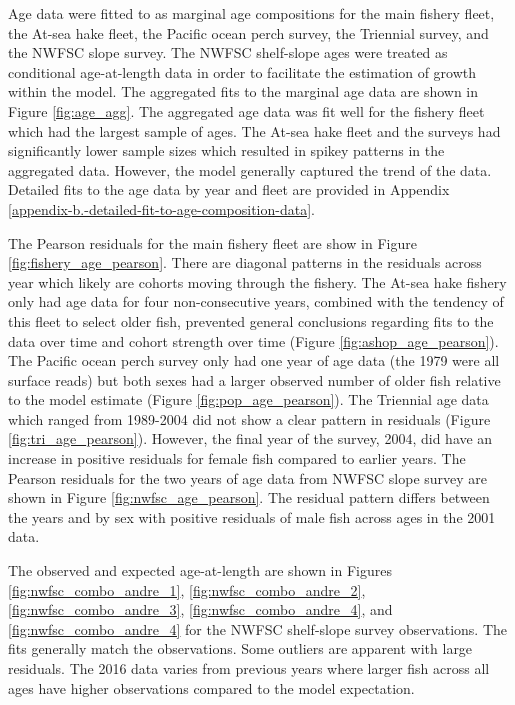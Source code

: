 \documentclass[12pt,]{article}
\begin{document}
Age data were fitted to as marginal age compositions for the main
fishery fleet, the At-sea hake fleet, the Pacific ocean perch survey,
the Triennial survey, and the NWFSC slope survey. The NWFSC shelf-slope
ages were treated as conditional age-at-length data in order to
facilitate the estimation of growth within the model. The aggregated
fits to the marginal age data are shown in Figure \ref{fig:age_agg}. The
aggregated age data was fit well for the fishery fleet which had the
largest sample of ages. The At-sea hake fleet and the surveys had
significantly lower sample sizes which resulted in spikey patterns in
the aggregated data. However, the model generally captured the trend of
the data. Detailed fits to the age data by year and fleet are provided
in Appendix \ref{appendix-b.-detailed-fit-to-age-composition-data}.

The Pearson residuals for the main fishery fleet are show in Figure
\ref{fig:fishery_age_pearson}. There are diagonal patterns in the
residuals across year which likely are cohorts moving through the
fishery. The At-sea hake fishery only had age data for four
non-consecutive years, combined with the tendency of this fleet to
select older fish, prevented general conclusions regarding fits to the
data over time and cohort strength over time (Figure
\ref{fig:ashop_age_pearson}). The Pacific ocean perch survey only had
one year of age data (the 1979 were all surface reads) but both sexes
had a larger observed number of older fish relative to the model
estimate (Figure \ref{fig:pop_age_pearson}). The Triennial age data
which ranged from 1989-2004 did not show a clear pattern in residuals
(Figure \ref{fig:tri_age_pearson}). However, the final year of the
survey, 2004, did have an increase in positive residuals for female fish
compared to earlier years. The Pearson residuals for the two years of
age data from NWFSC slope survey are shown in Figure
\ref{fig:nwfsc_age_pearson}. The residual pattern differs between the
years and by sex with positive residuals of male fish across ages in the
2001 data.

The observed and expected age-at-length are shown in Figures
\ref{fig:nwfsc_combo_andre_1}, \ref{fig:nwfsc_combo_andre_2},
\ref{fig:nwfsc_combo_andre_3}, \ref{fig:nwfsc_combo_andre_4}, and
\ref{fig:nwfsc_combo_andre_4} for the NWFSC shelf-slope survey
observations. The fits generally match the observations. Some outliers
are apparent with large residuals. The 2016 data varies from previous
years where larger fish across all ages have higher observations
compared to the model expectation.
\end{document}
